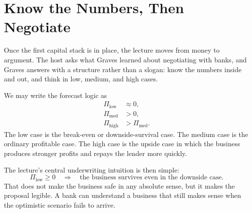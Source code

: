 \section{Know the Numbers, Then Negotiate}

Once the first capital stack is in place, the lecture moves from money to argument. The host asks what Graves learned about negotiating with banks, and Graves answers with a structure rather than a slogan: know the numbers inside and out, and think in low, medium, and high cases.

We may write the forecast logic as
\begin{align}
\Pi_{\mathrm{low}} &\approx 0,\\
\Pi_{\mathrm{med}} &> 0,\\
\Pi_{\mathrm{high}} &> \Pi_{\mathrm{med}}.
\end{align}
The low case is the break-even or downside-survival case. The medium case is the ordinary profitable case. The high case is the upside case in which the business produces stronger profits and repays the lender more quickly.

\begin{figure}[h]
\centering
{}
\end{figure}

The lecture's central underwriting intuition is then simple:
\begin{equation}
\Pi_{\mathrm{low}} \ge 0
\quad\Longrightarrow\quad
\text{the business survives even in the downside case.}
\end{equation}
That does not make the business safe in any absolute sense, but it makes the proposal legible. A bank can understand a business that still makes sense when the optimistic scenario fails to arrive.

